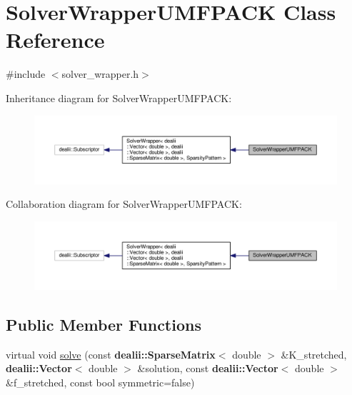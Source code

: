 \hypertarget{class_solver_wrapper_u_m_f_p_a_c_k}{}\section{Solver\+Wrapper\+U\+M\+F\+P\+A\+CK Class Reference}
\label{class_solver_wrapper_u_m_f_p_a_c_k}


{\ttfamily \#include $<$solver\+\_\+wrapper.\+h$>$}



Inheritance diagram for Solver\+Wrapper\+U\+M\+F\+P\+A\+CK\+:\nopagebreak
\begin{figure}[H]
\begin{center}
\leavevmode
\includegraphics[width=350pt]{class_solver_wrapper_u_m_f_p_a_c_k__inherit__graph}
\end{center}
\end{figure}


Collaboration diagram for Solver\+Wrapper\+U\+M\+F\+P\+A\+CK\+:\nopagebreak
\begin{figure}[H]
\begin{center}
\leavevmode
\includegraphics[width=350pt]{class_solver_wrapper_u_m_f_p_a_c_k__coll__graph}
\end{center}
\end{figure}
\subsection*{Public Member Functions}
\begin{DoxyCompactItemize}
\item 
virtual void \hyperlink{class_solver_wrapper_u_m_f_p_a_c_k_a68f5e2055270d172a4ffdf4a8a4f536e}{solve} (const {\bf dealii\+::\+Sparse\+Matrix}$<$ double $>$ \&K\+\_\+stretched, {\bf dealii\+::\+Vector}$<$ double $>$ \&solution, const {\bf dealii\+::\+Vector}$<$ double $>$ \&f\+\_\+stretched, const bool symmetric=false)
\end{DoxyCompactItemize}


